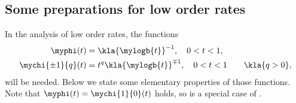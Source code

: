 \documentclass[10pt]{article}
\theoremstyle{definition}
\begin{document}
\subsection{Some preparations for low order rates}
\label{low_order_preparations}
In the analysis of low order rates, the functions
%
\begin{align}
\myphi(t) & = \kla{\mylogb{t}}^{-1}, \quad 0 < t < 1,
\label{eq:phi-def} \\
\mychi{\pm 1}{q}(t) & = t^q \kla{\mylogb{t}}^{\mp 1}, \quad 0 < t < 1
\qquad \kla{q > 0},
\label{eq:chi-def}
\end{align}
%
will be needed. Below we state some elementary properties of those functions.
Note that $ \myphi(t) = \mychi{1}{0}(t) $ holds, so
 is a special case of .
%
\end{document}
